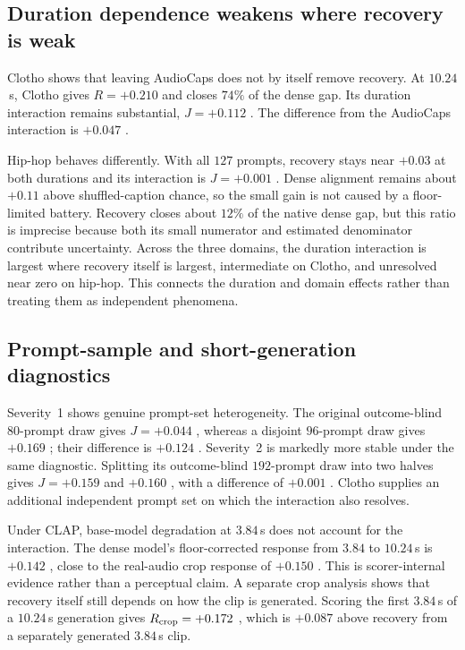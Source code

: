 \subsection{Duration dependence weakens where recovery is weak}
Clotho shows that leaving AudioCaps does not by itself remove recovery. At $10.24$\,s, Clotho gives $R=+0.210$  and closes $74\%$ of the dense gap. Its duration interaction remains substantial, $J=+0.112$ . The difference from the AudioCaps interaction is $+0.047$ .

Hip-hop behaves differently. With all $127$ prompts, recovery stays near $+0.03$ at both durations and its interaction is $J=+0.001$ . Dense alignment remains about $+0.11$ above shuffled-caption chance, so the small gain is not caused by a floor-limited battery. Recovery closes about $12\%$ of the native dense gap, but this ratio is imprecise because both its small numerator and estimated denominator contribute uncertainty. Across the three domains, the duration interaction is largest where recovery itself is largest, intermediate on Clotho, and unresolved near zero on hip-hop. This connects the duration and domain effects rather than treating them as independent phenomena.

\subsection{Prompt-sample and short-generation diagnostics}
Severity~1 shows genuine prompt-set heterogeneity. The original outcome-blind $80$-prompt draw gives $J=+0.044$ , whereas a disjoint $96$-prompt draw gives $+0.169$ ; their difference is $+0.124$ . Severity~2 is markedly more stable under the same diagnostic. Splitting its outcome-blind $192$-prompt draw into two halves gives $J=+0.159$  and $+0.160$ , with a difference of $+0.001$ . Clotho supplies an additional independent prompt set on which the interaction also resolves.

Under CLAP, base-model degradation at $3.84$\,s does not account for the interaction. The dense model's floor-corrected response from $3.84$ to $10.24$\,s is $+0.142$ , close to the real-audio crop response of $+0.150$ . This is scorer-internal evidence rather than a perceptual claim. A separate crop analysis shows that recovery itself still depends on how the clip is generated. Scoring the first $3.84$\,s of a $10.24$\,s generation gives $R_{\rm crop}=+0.172$ , which is $+0.087$  above recovery from a separately generated $3.84$\,s clip.
